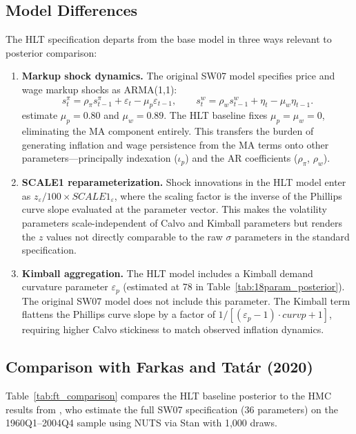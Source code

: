 \documentclass[12pt]{article}
\theoremstyle{plain}
\theoremstyle{definition}
\theoremstyle{remark}
\begin{document}
\subsection{Model Differences}

The HLT specification departs from the base \citet{smets2007shocks} model in three ways relevant to posterior comparison:

\begin{enumerate}
\item \textbf{Markup shock dynamics.} The original SW07 model specifies price and wage markup shocks as ARMA(1,1):
\[
s_t^{\pi} = \rho_\pi s_{t-1}^{\pi} + \varepsilon_t - \mu_p \varepsilon_{t-1}, \qquad
s_t^{w} = \rho_w s_{t-1}^{w} + \eta_t - \mu_w \eta_{t-1}.
\]
\citet{farkas2020bayesian} estimate $\mu_p = 0.80$ and $\mu_w = 0.89$. The HLT baseline fixes $\mu_p = \mu_w = 0$, eliminating the MA component entirely. This transfers the burden of generating inflation and wage persistence from the MA terms onto other parameters---principally indexation ($\iota_p$) and the AR coefficients ($\rho_\pi$, $\rho_w$).

\item \textbf{SCALE1 reparameterization.} Shock innovations in the HLT model enter as $z_{\varepsilon}/100 \times \textit{SCALE1}_\varepsilon$, where the scaling factor is the inverse of the Phillips curve slope evaluated at the parameter vector. This makes the volatility parameters scale-independent of Calvo and Kimball parameters but renders the $z$ values not directly comparable to the raw $\sigma$ parameters in the standard specification.

\item \textbf{Kimball aggregation.} The HLT model includes a Kimball demand curvature parameter $\varepsilon_p$ (estimated at 78 in Table~\ref{tab:18param_posterior}). The original SW07 model does not include this parameter. The Kimball term flattens the Phillips curve slope by a factor of $1/[(\varepsilon_p - 1)\cdot \textit{curvp} + 1]$, requiring higher Calvo stickiness to match observed inflation dynamics.
\end{enumerate}

\subsection{Comparison with Farkas and Tat\'ar (2020)}

Table~\ref{tab:ft_comparison} compares the HLT baseline posterior to the HMC results from \citet{farkas2020bayesian}, who estimate the full SW07 specification (36 parameters) on the 1960Q1--2004Q4 sample using NUTS via Stan with 1,000 draws.
\end{document}

